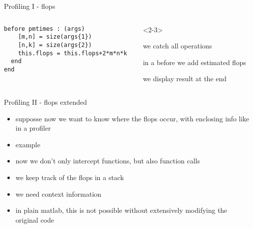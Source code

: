 \begin{frame}[fragile]{Profiling I - flops}
\begin{columns}
\begin{column}{5cm}
\begin{onlyenv}
\begin{Verbatim}[commandchars=@\[\]]
  before pmtimes : (args)
    [m,n] = size(args{1})
    [n,k] = size(args{2})
    this.flops = this.flops+2*m*n*k
  end
end
        \end{Verbatim}
      \end{onlyenv}
      \end{column}
      \begin{column}{5cm}
        \begin{itemize}
          \begin{onlyenv}<2-3>
          \item we catch all operations
          \item in a before we add estimated flops
          \item we display result at the end
          \end{onlyenv}
        \end{itemize}
      \end{column}
    \end{columns}



\end{frame}

\begin{frame}{Profiling II - flops extended}
  \begin{itemize}
  \item supposse now we want to know where the flops occur, with
    enclosing info like in a profiler
  \item example
  \item now we don't only intercept functions, but also function calls
  \item we keep track of the flops in a stack
  \item we need context information
  \item in plain matlab, this is not possible without extensively
  modifying the original code
  \end{itemize}
\end{frame}

